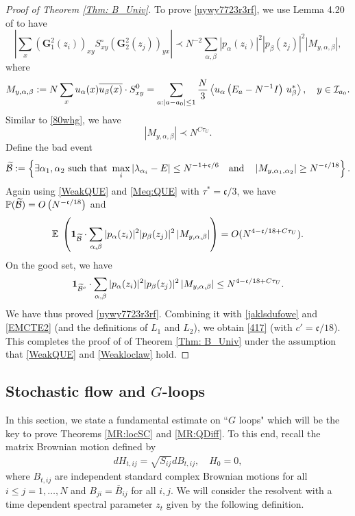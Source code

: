 \documentclass[10pt,reqno]{article}
\renewcommand{\bar}{\overline}
\theoremstyle{plain} %
\theoremstyle{remark}
\numberwithin{equation}{section}
\begin{document}
\begin{proof}[Proof of Theorem \ref{Thm: B_Univ}]
To prove  \eqref{uywy7723r3rf}, we use  Lemma 4.20 of \cite{Xu:2024aa}  to have 
$$
  \left|  \sum_{  x}\left(\mathbf{G}_1^2\left(z_i\right)\right)_{xy} S_{x y}^{\circ}\left(\mathbf{G}_2^2\left(z_j\right)\right)_{yx}\right|
\prec N^{-2} \sum_{\alpha,\beta} |p_\alpha(z_i)|^2|p_\beta(z_j)|^2 \left|M_{y,\alpha,\beta}\right|,
$$
where
 $$
 M_{y,\alpha,\beta}:= N \sum_{x}u_\alpha(x) \overline{u_{\beta}(x)}\cdot S^0_{xy}= \sum_{a: |a-a_0|\le 1}\frac N 3
     \left\langle u_\alpha \left(E_a-N^{-1} I\right) \,u^*_\beta\right\rangle, \quad y\in {\cal I}_{a_0}.
$$
Similar to \eqref{80whg}, we have
$$
    \left|M_{y,\alpha,\beta}\right|\prec N^{C\tau_U}.
$$
Define the bad event  
$$
\widetilde{\cal B} := \left\{\exists \alpha_1,\alpha_2 \mbox { such that } \max_i|\lambda_{\alpha_i}-E|\le N^{-1+\mathfrak c/6} \quad \mbox {and} \quad \left| M_{y,\alpha_1,\alpha_2}\right|\ge N^{ -\mathfrak c/18}\right\}.
$$
Again using  \eqref{WeakQUE} and \eqref{Meq:QUE} with  $\tau^*=\mathfrak c/3$,  we have 
$\mathbb P (\widetilde{{\cal B}}  )=O\left(N^{-\mathfrak c/18}\right)$ and 
$$
\mathbb E\; \left(
{\bf 1}_{\widetilde{{\cal B}} }\cdot \sum_{\alpha,\beta} |p_\alpha(z_i)|^2|p_\beta(z_j)|^2 \left|M_{y,\alpha,\beta} \right|
\right)
=O( N^{4-\mathfrak c/18+C\tau_U} ).
$$
On the good set, we have 
$$
{\bf 1}_{\widetilde{{\cal B}}^c }\cdot \sum_{\alpha,\beta} |p_\alpha(z_i)|^2|p_\beta(z_j)|^2 \left|M_{y,\alpha,\beta} \right|
\le N^{4-\mathfrak c/18+C\tau_U}.  
$$
We have thus proved  \eqref{uywy7723r3rf}.  
Combining it with \eqref{jaklsdufowe} and \eqref{EMCTE2} (and the definitions of $L_1$ and $L_2$), we obtain \eqref{417} (with $c'=\mathfrak c/18$). 
This completes the proof of of Theorem \ref{Thm: B_Univ}  under the assumption that 
\eqref{WeakQUE} and \eqref{Weakloclaw} hold. 

\end{proof}

\subsection{Stochastic flow and   \texorpdfstring{$G$}{G}-loops}
In this section, we  state  a fundamental estimate on ``$G$ loops" which will be the key to prove 
Theorems \ref{MR:locSC} and \ref{MR:QDiff}.  To this end,  recall 
the matrix Brownian  motion   defined by 
\begin{align}\label{def_mainHT}
dH_{t,ij}=\sqrt{S_{ij}}dB_{t,ij}, \quad H_{0}=0, 
\end{align}
where $B_{t,ij}$ are independent standard complex Brownian motions for all $i \le j=1,\ldots,N$ and  $B_{ji} = \bar  B_{ij}$ for all $i, j$. 
We will consider the resolvent with a time dependent spectral parameter $z_t$ given by the following definition. 
\end{document}
